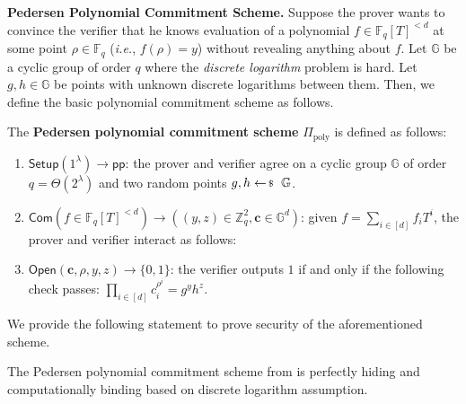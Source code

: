 \documentclass[../../book]{subfiles}
\begin{document}
\textbf{Pedersen Polynomial Commitment Scheme.} Suppose the prover wants to convince the verifier that he knows evaluation of a polynomial $f \in \mathbb{F}_{q}[T]^{<d}$ at some point $\rho \in \mathbb{F}_q$ (\textit{i.e.}, $f(\rho) = y$) without revealing anything about $f$. Let $\mathbb{G}$ be a cyclic group of order $q$ where the \textit{discrete logarithm} problem is hard. 
Let $g,h \in \mathbb{G}$ be points with unknown discrete logarithms between them. Then, we define the basic polynomial commitment scheme as follows.

\begin{definition}\label{def:pedersen-poly-commitment}
    The \textbf{Pedersen polynomial commitment scheme} $\Pi_{\text{poly}}$ is defined as follows:
    \begin{enumerate}
        \item $\mathsf{Setup}(1^{\lambda}) \to \mathsf{pp}$: the prover and verifier agree on a cyclic group $\mathbb{G}$ of order $q = \Theta(2^{\lambda})$ and two random points $g,h \leftarrowS \mathbb{G}$.
        \item $\mathsf{Com}(f \in \mathbb{F}_q[T]^{<d}) \to ((y,z) \in \mathbb{Z}_q^2, \mathbf{c} \in \mathbb{G}^d)$: given $f=\sum_{i \in [d]}f_iT^i$, the prover and verifier interact as follows:
        \item $\mathsf{Open}(\mathbf{c}, \rho, y, z) \to \{0,1\}$: the verifier outputs $1$ if and only if the following check passes: $\prod_{i \in [d]} c_i^{\rho^i} = g^yh^z$.
    \end{enumerate}
\end{definition}

We provide the following statement to prove security of the aforementioned scheme.

\begin{lemma}
    The Pedersen polynomial commitment scheme from  is perfectly hiding and computationally binding based on discrete logarithm assumption.
\end{lemma}
\end{document}

